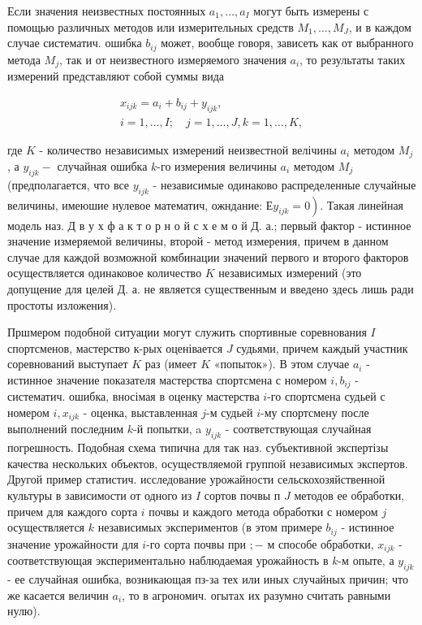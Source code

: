 \documentclass[10pt]{article}
\begin{document}
Если значения неизвестных постоянных $a_{1}, \ldots, a_{I}$ могут быть измерены с помощью различных методов или измерительных средств $M_{1}, \ldots, M_{J}$, и в каждом случае систематич. ошибка $b_{i j}$ может, вообще говоря, зависеть как от выбранного метода $M_{j}$, так и от неизвестного измеряемого значения $a_{i}$, то результаты таких измерений представляют собой суммы вида



\[

\begin{gathered}

x_{i j k}=a_{i}+b_{i j}+y_{i j k}, \\

i=1, \ldots, I ; \quad j=1, \ldots, J, k=1, \ldots, K,

\end{gathered}

\]



где $K$ - количество независимых измерений неизвестной велічины $a_{i}$ методом $M_{j}$, а $y_{i j k}-$ случайная ошибка $k$-го измерения величины $a_{i}$ методом $M_{j}$ (предполагается, что все $y_{i j k}$ - независимые одинаково распределенные случайные величины, имеюшие нулевое математич, ожндание: $\left.Е y_{i j k}=0\right)$. Такая линейная модель наз. Д в у х ф а к т о р н о й с х е м о й Д. а.; первый фактор - истинное значение измеряемой величины, второй - метод измерения, причем в данном случае для каждой возможной комбинации значений первого и второго факторов осуществляется одинаковое количество $K$ независимых измерений (это допущение для целей Д. а. не является существенным и введено здесь лишь ради простоты изложения).



Пршмером подобной ситуации могут служить спортивные соревнования $I$ спортсменов, мастерство к-рых оценівается $J$ судьями, причем каждый участник соревнований выступает $K$ раз (имеет $K$ «попыток»). В этом случае $a_{i}$ - истинное значение показателя мастерства спортсмена с номером $i, b_{i j}$ - систематич. ошибка, вносімая в оценку мастерства $i$-го спортсмена судьей с номером $i, x_{i j k}$ - оценка, выставленная $j$-м судьей $i$-му спортсмену после выполнений последним $k$-й попытки, a $y_{i j k}$ - соответствующая случайная погрешность. Подобная схема типична для так наз. субъективной экспертізы качества нескольких объектов, осуществляемой группой независимых экспертов. Другой пример статистич. исследование урожайности сельскохозяйственной культуры в зависимости от одного из $I$ сортов почвы п $J$ методов ее обработки, причем для каждого сорта $i$ почвы и каждого метода обработки с номером $j$ осуществляется $k$ независимых экспериментов (в этом примере $b_{i j}$ - истинное значение урожайности для $i$-го сорта почвы при $;-$ м способе обработки, $x_{i j k}$ - соответствующая экспериментально наблюдаемая урожайность в $k$-м опыте, а $y_{i j k}$ - ее случайная ошибка, возникающая пз-за тех или иных случайных причин; что же касается величин $a_{i}$, то в агрономич. огытах их разумно считать равными нулю).
\end{document}
